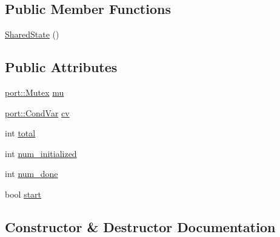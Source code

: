 \subsection*{Public Member Functions}
\begin{DoxyCompactItemize}
\item 
\hyperlink{structleveldb_1_1anonymous__namespace_02db__bench_8cc_03_1_1_shared_state_ac53cfd2acbef41301c4cf33182e0cf2b}{Shared\+State} ()
\end{DoxyCompactItemize}
\subsection*{Public Attributes}
\begin{DoxyCompactItemize}
\item 
\hyperlink{classleveldb_1_1port_1_1_mutex}{port\+::\+Mutex} \hyperlink{structleveldb_1_1anonymous__namespace_02db__bench_8cc_03_1_1_shared_state_ada314e8ff48e6409acfcdd06ad7ae905}{mu}
\item 
\hyperlink{classleveldb_1_1port_1_1_cond_var}{port\+::\+Cond\+Var} \hyperlink{structleveldb_1_1anonymous__namespace_02db__bench_8cc_03_1_1_shared_state_afbb55e80ee993fa55e4f8b887bf14945}{cv}
\item 
int \hyperlink{structleveldb_1_1anonymous__namespace_02db__bench_8cc_03_1_1_shared_state_a89bdd25e1515a59494cb1cc4b11283c0}{total}
\item 
int \hyperlink{structleveldb_1_1anonymous__namespace_02db__bench_8cc_03_1_1_shared_state_a06982cd9f8ad39fceec4cce13c49ef78}{num\+\_\+initialized}
\item 
int \hyperlink{structleveldb_1_1anonymous__namespace_02db__bench_8cc_03_1_1_shared_state_a9f161eefe9ee952e9fe6b183b53a317d}{num\+\_\+done}
\item 
bool \hyperlink{structleveldb_1_1anonymous__namespace_02db__bench_8cc_03_1_1_shared_state_a4524c3bfdfc8b94ddd4f66f3d60cc8c4}{start}
\end{DoxyCompactItemize}


\subsection{Constructor \& Destructor Documentation}
\hypertarget{structleveldb_1_1anonymous__namespace_02db__bench_8cc_03_1_1_shared_state_ac53cfd2acbef41301c4cf33182e0cf2b}{}
